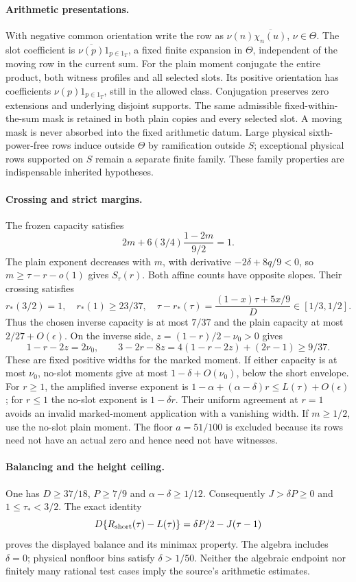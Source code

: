 \paragraph{Arithmetic presentations.}
With negative common orientation write the row as
$\nu(n)\overline{\chi_n(u)}$, $\nu\in\Theta$. The slot coefficient
is $\overline{\nu(p)}1_{p\in1_T}$, a fixed finite expansion in
$\Theta$, independent of the moving row in the current sum.
For the plain moment conjugate the entire product, both witness
profiles and all selected slots. Its positive orientation has
coefficients $\nu(p)1_{p\in1_T}$, still in the allowed class.
Conjugation preserves zero extensions and underlying disjoint supports.
The same admissible fixed-within-the-sum mask is retained in both
plain copies and every selected slot. A moving mask is never absorbed
into the fixed arithmetic datum. Large physical sixth-power-free rows
induce outside $\Theta$ by ramification outside $S$; exceptional
physical rows supported on $S$ remain a separate finite family.
These family properties are indispensable inherited hypotheses.

\paragraph{Crossing and strict margins.}
The frozen capacity satisfies
\[
 2m+6(3/4)\frac{1-2m}{9/2}=1.
\]
The plain exponent decreases with $m$, with derivative
$-2\delta+8q/9<0$, so $m\ge\tau-r-o(1)$ gives $S_\tau(r)$.
Both affine counts have opposite slopes. Their crossing satisfies
\[
 r_*(3/2)=1,\quad r_*(1)\ge23/37,\quad
 \tau-r_*(\tau)=\frac{(1-x)\tau+5x/9}{D}\in[1/3,1/2].
\]
Thus the chosen inverse capacity is at most $7/37$ and the plain
capacity at most $2/27+O(\epsilon)$. On the inverse side,
$z=(1-r)/2-\nu_0>0$ gives
\[
 1-r-2z=2\nu_0,\qquad
 3-2r-8z=4(1-r-2z)+(2r-1)\ge9/37.
\]
These are fixed positive widths for the marked moment.
If either capacity is at most $\nu_0$, no-slot moments give at most
$1-\delta+O(\nu_0)$, below the short envelope.
For $r\ge1$, the amplified inverse exponent is
$1-\alpha+(\alpha-\delta)r\le L(\tau)+O(\epsilon)$;
for $r\le1$ the no-slot exponent is $1-\delta r$.
Their uniform agreement at $r=1$ avoids an invalid marked-moment
application with a vanishing width. If $m\ge1/2$, use the no-slot
plain moment. The floor $a=51/100$ is excluded because its rows
need not have an actual zero and hence need not have witnesses.

\paragraph{Balancing and the height ceiling.}
One has $D\ge37/18$, $P\ge7/9$ and
$\alpha-\delta\ge1/12$. Consequently $J>\delta P\ge0$ and
$1\le\tau_*<3/2$. The exact identity
\[
 D\{R_{\rm short}(\tau)-L(\tau)\}
 =\delta P/2-J(\tau-1)
\]
proves the displayed balance and its minimax property.
The algebra includes $\delta=0$; physical nonfloor bins satisfy
$\delta>1/50$. Neither the algebraic endpoint nor finitely many
rational test cases imply the source's arithmetic estimates.

